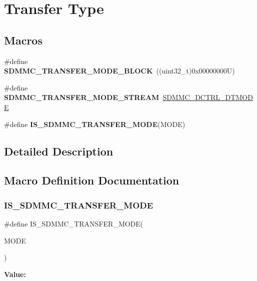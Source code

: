 \hypertarget{group___s_d_m_m_c___l_l___transfer___type}{}\section{Transfer Type}
\label{group___s_d_m_m_c___l_l___transfer___type}
\subsection*{Macros}
\begin{DoxyCompactItemize}
\item 
\mbox{\label{group___s_d_m_m_c___l_l___transfer___type_gae394862bf9291bbe60ed2bf246b8370b}} 
\#define {\bfseries S\+D\+M\+M\+C\+\_\+\+T\+R\+A\+N\+S\+F\+E\+R\+\_\+\+M\+O\+D\+E\+\_\+\+B\+L\+O\+CK}~((uint32\+\_\+t)0x00000000\+U)
\item 
\mbox{\label{group___s_d_m_m_c___l_l___transfer___type_gab294ac5c08ab7fd1c9719116bc3e48be}} 
\#define {\bfseries S\+D\+M\+M\+C\+\_\+\+T\+R\+A\+N\+S\+F\+E\+R\+\_\+\+M\+O\+D\+E\+\_\+\+S\+T\+R\+E\+AM}~\mbox{\hyperlink{group___peripheral___registers___bits___definition_gae043db7a31c549b3386ff112319a9cf4}{S\+D\+M\+M\+C\+\_\+\+D\+C\+T\+R\+L\+\_\+\+D\+T\+M\+O\+DE}}
\item 
\#define {\bfseries I\+S\+\_\+\+S\+D\+M\+M\+C\+\_\+\+T\+R\+A\+N\+S\+F\+E\+R\+\_\+\+M\+O\+DE}(M\+O\+DE)
\end{DoxyCompactItemize}


\subsection{Detailed Description}


\subsection{Macro Definition Documentation}
\mbox{\label{group___s_d_m_m_c___l_l___transfer___type_gade6b54c991ddd477347cd5e10cc125ca}} 
\subsubsection{\texorpdfstring{IS\_SDMMC\_TRANSFER\_MODE}{IS\_SDMMC\_TRANSFER\_MODE}}
{\footnotesize\ttfamily \#define I\+S\+\_\+\+S\+D\+M\+M\+C\+\_\+\+T\+R\+A\+N\+S\+F\+E\+R\+\_\+\+M\+O\+DE(\begin{DoxyParamCaption}\item[{}]{M\+O\+DE }\end{DoxyParamCaption})}

{\bfseries Value\+:}
\begin{DoxyCode}{0}

\end{DoxyCode}
